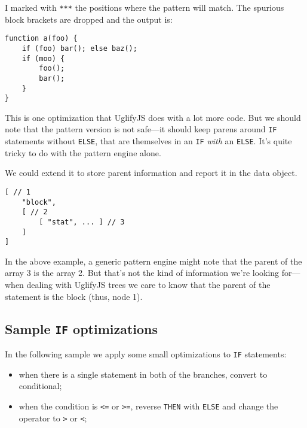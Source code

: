 \documentclass[a4paper,10pt]{article}
\begin{document}
I marked with \texttt{***} the positions where the pattern will match.  The
spurious block brackets are dropped and the output is:


\begin{verbatim}
function a(foo) {
    if (foo) bar(); else baz();
    if (moo) {
        foo();
        bar();
    }
}
\end{verbatim}

This is one optimization that UglifyJS does with a lot more code.  But we
should note that the pattern version is not safe—it should keep parens
around \texttt{IF} statements without \texttt{ELSE}, that are themselves in an \texttt{IF} \emph{with}
an \texttt{ELSE}.  It's quite tricky to do with the pattern engine alone.

We could extend it to store parent information and report it in the data
object.


\begin{verbatim}
[ // 1
    "block",
    [ // 2
        [ "stat", ... ] // 3
    ]
]
\end{verbatim}

In the above example, a generic pattern engine might note that the parent of
the array 3 is the array 2.  But that's not the kind of information we're
looking for—when dealing with UglifyJS trees we care to know that the
parent of the statement is the block (thus, node 1).
\subsection{Sample \texttt{IF} optimizations}
\label{sec-3-2}


In the following sample we apply some small optimizations to \texttt{IF}
statements:

\begin{itemize}
\item when there is a single statement in both of the branches, convert to
  conditional;
\item when the condition is \texttt{<=} or \texttt{>=}, reverse \texttt{THEN} with \texttt{ELSE} and change
  the operator to \texttt{>} or \texttt{<};
\end{itemize}
\end{document}
